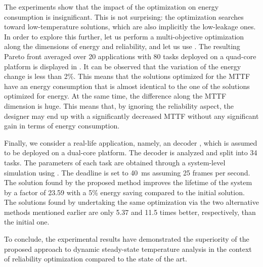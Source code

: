 The experiments show that the impact of the optimization on energy consumption
is insignificant. This is not surprising: the optimization searches toward
low-temperature solutions, which are also implicitly the low-leakage ones. In
order to explore this further, let us perform a multi-objective optimization
along the dimensions of energy and reliability, and let us use 
\cite{deb2002}. The resulting Pareto front averaged over 20 applications with 80
tasks deployed on a quad-core platform is displayed in
. It can be observed that the variation of the
energy change is less than 2\%. This means that the solutions optimized for the
\ac{MTTF} have an energy consumption that is almost identical to the one of the
solutions optimized for energy. At the same time, the difference along the
\ac{MTTF} dimension is huge. This means that, by ignoring the reliability
aspect, the designer may end up with a significantly decreased \ac{MTTF} without
any significant gain in terms of energy consumption.

Finally, we consider a real-life application, namely, an  decoder
\cite{ffmpeg}, which is assumed to be deployed on a dual-core platform. The
decoder is analyzed and split into 34 tasks. The parameters of each task are
obtained through a system-level simulation using  \cite{benini2005}.
The deadline is set to 40~ms assuming 25 frames per second. The solution found
by the proposed method improves the lifetime of the system by a factor of 23.59
with a 5\% energy saving compared to the initial solution. The solutions found
by undertaking the same optimization via the two alternative methods mentioned
earlier are only 5.37 and 11.5 times better, respectively, than the initial one.

To conclude, the experimental results have demonstrated the superiority of the
proposed approach to dynamic steady-state temperature analysis in the context of
reliability optimization compared to the state of the art.
